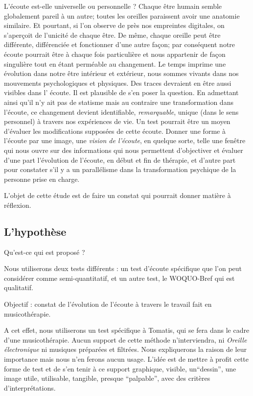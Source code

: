 L'écoute est-elle universelle ou personnelle ?
 Chaque être humain semble  globalement pareil à un autre; toutes les oreilles paraissent  avoir une anatomie similaire. Et pourtant, si l'on observe de près nos empreintes digitales, on s'aperçoit de l'unicité de chaque être. De même, chaque oreille peut être différente, différenciée et  fonctionner d'une autre façon;  par conséquent notre  écoute pourrait être à chaque fois particulière et nous appartenir de façon singulière tout en étant perméable au changement.
Le temps imprime une évolution dans notre être intérieur et extérieur, nous sommes vivants dans nos mouvements psychologiques et physiques. Des traces devraient en être aussi visibles dans l' écoute. Il est plausible de s'en poser la question.
En admettant ainsi qu'il n'y ait pas de statisme mais au contraire une transformation dans l'écoute, ce changement devient identifiable, \textit{remarquable}, unique (dans le sens personnel) à travers nos expériences de vie.  Un test pourrait être un moyen d'évaluer les modifications supposées de cette écoute. 
Donner une forme à l'écoute par une image, une \emph{vision de l'écoute}, en quelque sorte, telle une fenêtre qui nous ouvre sur des informations qui nous permettent d'objectiver et évaluer d'une part 
 l'évolution de l'écoute, en début et fin de thérapie, et d'autre part pour constater s'il y a un parallélisme dans la transformation psychique  de la personne prise en charge.

L'objet de cette étude est de faire un constat
qui pourrait donner matière à réflexion.


\subsection{L'hypothèse}

Qu'est-ce qui est proposé ? 
	
	Nous utiliserons deux tests différents : 
	un test d'écoute spécifique que l'on peut considérer comme semi-quantitatif, 
	et un autre test, le WOQUO-Bref qui est qualitatif.
	
Objectif : constat de l'évolution de l'écoute à travers le travail fait en musicothérapie.

A cet effet, nous utiliserons un test spécifique à Tomatis, qui se fera dans le cadre d'une musicothérapie. Aucun support de cette méthode n'interviendra, ni \textsl{Oreille
	électronique} ni musiques préparées et filtrées. Nous expliquerons la raison de   leur importance mais nous n'en ferons aucun usage. L'idée est de mettre à profit cette forme de test et de  s'en tenir à ce support
graphique, visible, un``dessin'', une image utile, utilisable, tangible,
presque ``palpable'', avec des critères
d'interprétations.
	



